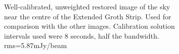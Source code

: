 \begin{figure}
\begin{subfigure}{.43\textwidth}
\caption{\label{image.3c295.goodcal-2} Well-calibrated, unweighted restored image of the sky near the centre of the Extended Groth Strip. Used for comparison with the other images. Calibration solution intervals used were 8 seconds, half the bandwidth. rms=5.87mJy/beam}
\end{subfigure}
\hfill
\begin{subfigure}{.43\textwidth}

\end{subfigure}
\end{figure}

